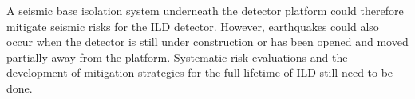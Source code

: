 
A seismic base isolation system underneath the detector platform could therefore mitigate seismic risks for the ILD detector. However, earthquakes could also occur when the detector is still under construction or has been opened and moved partially away from the platform. Systematic risk evaluations and the development of mitigation strategies for the full lifetime of ILD still need to be done.
